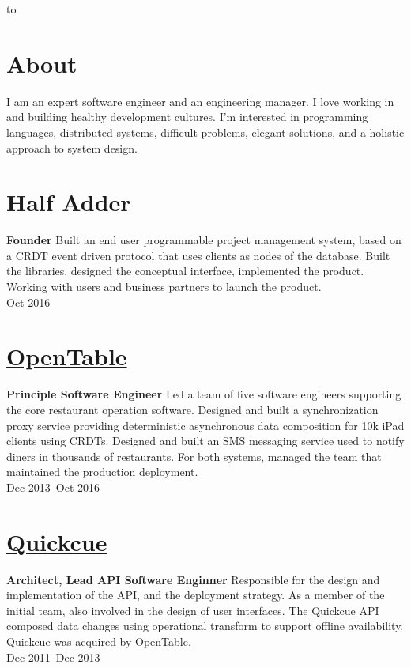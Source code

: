 \documentclass[margin]{res}
\begin{document}

\hbox to 

\begin{resume}
\section{About}

I am an expert software engineer and an engineering manager. I love
working in and building healthy development cultures. I'm interested
in programming languages, distributed systems, difficult problems,
elegant solutions, and a holistic approach to system design.

\section{Half Adder}
{\bf Founder}
%
Built an end user programmable project management system, based on a
CRDT event driven protocol that uses clients as nodes of the database.
Built the libraries, designed the conceptual interface, implemented
the product. Working with users and business partners to launch the
product.\\
%
Oct 2016--

\section{\href{https://opentable.com/}{OpenTable}}
{\bf Principle Software Engineer}
%
Led a team of five software engineers supporting the core restaurant
operation software. Designed and built a synchronization proxy service
providing deterministic asynchronous data composition for 10k iPad
clients using CRDTs. Designed and built an SMS messaging service used
to notify diners in thousands of restaurants. For both systems,
managed the team that maintained the production deployment.\\
%
Dec 2013--Oct 2016

\section{\href{https://quickcue.com/}{Quickcue}}
{\bf Architect, Lead API Software Enginner}
%
Responsible for the design and implementation of the API, and the
deployment strategy. As a member of the initial team, also involved in
the design of user interfaces. The Quickcue API composed data changes
using operational transform to support offline availability. Quickcue
was acquired by OpenTable.\\
%
Dec 2011--Dec 2013


\end{resume}
\end{document}
